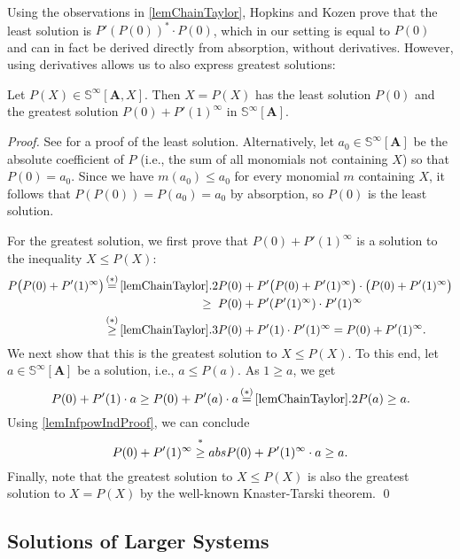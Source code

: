 \documentclass[english,runningheads,a4paper,envcountsame]{llncs}
\newcommand{\Sinf}{{\mathbb S}^{\infty}}
\renewcommand{\AA}{{\bm A}}
\newcommand{\eqInfo}[1]{\overset{\clap{\scriptsize #1}}{=}}
\newcommand{\geInfo}[1]{\overset{\clap{\scriptsize #1}}{\ge}}
\newcommand{\eqLabel}[1]{\eqInfo{$(#1)$}}
\newcommand{\geLabel}[1]{\geInfo{$(#1)$}}
\begin{document}
Using the observations in \cref{lemChainTaylor}, Hopkins and Kozen prove that the least solution is $P'(P(0))^* \cdot P(0)$, which in our setting is equal to $P(0)$ and can in fact be derived directly from absorption, without derivatives.
However, using derivatives allows us to also express greatest solutions:

\begin{theorem}\label{thmIterativeOne}
Let $P(X) \in \Sinf[\AA,X]$.
Then $X = P(X)$ has the least solution $P(0)$ and
the greatest solution $P(0) + P'(1)^\infty$ in $\Sinf[\AA]$.
\end{theorem} 
\begin{proof}
See \cite{Kleene} for a proof of the least solution.
Alternatively, let $a_0 \in \Sinf[\AA]$ be the absolute coefficient of $P$ (i.e., the sum of all monomials not containing $X$) so that $P(0) = a_0$.
Since we have $m(a_0) \le a_0$ for every monomial $m$ containing $X$, it follows that $P(P(0)) = P(a_0) = a_0$ by absorption, so $P(0)$ is the least solution.

For the greatest solution, we first prove that $P(0) + P'(1)^\infty$ is a solution to the inequality $X \le P(X)$:
\begin{align*}
    P\big(P(0) + P'(1)^\infty\big) \eqLabel*{\ref{lemChainTaylor}.2}{}
    &P(0) + P'\big(P(0) + P'(1)^\infty\big) \cdot \big(P(0) + P'(1)^\infty\big) \\ \ge{}\;
    &P(0) + P'(P'(1)^\infty) \cdot P'(1)^\infty \\ \geLabel*{\ref{lemChainTaylor}.3}{}
    &P(0) + P'(1) \cdot P'(1)^\infty = P(0) + P'(1)^\infty.
\end{align*}
We next show that this is the greatest solution to $X \le P(X)$.
To this end, let $a \in \Sinf[\AA]$ be a solution, i.e., $a \le P(a)$.
As $1 \ge a$, we get
\[
    P(0) + P'(1) \cdot a \ge P(0) + P'(a) \cdot a \eqLabel*{\ref{lemChainTaylor}.2} P(a) \ge a.
\]
Using \cref{lemInfpowIndProof}, we can conclude
\[
    P(0) + P'(1)^\infty \geInfo*{abs} P(0) + P'(1)^\infty \cdot a \ge a.
\]
Finally, note that the greatest solution to $X \le P(X)$ is also the greatest solution to $X = P(X)$ by the well-known Knaster-Tarski theorem. \qed
\end{proof}



\subsection{Solutions of Larger Systems}
\end{document}
